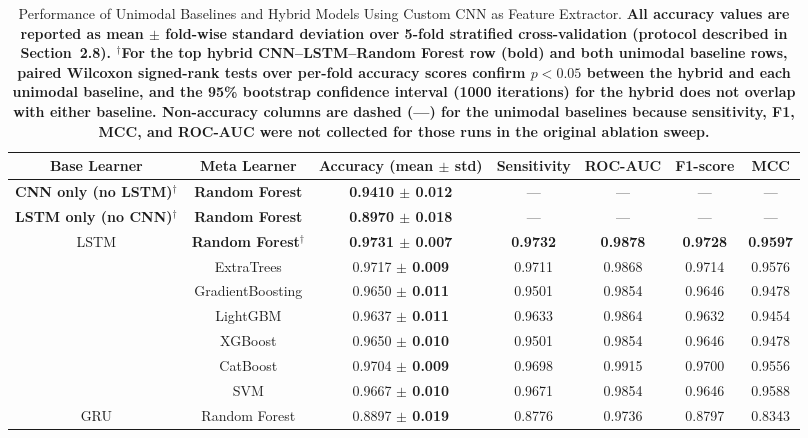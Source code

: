 \documentclass{elektr}
\newcommand{\yh}[1]{{\color{revhi}\textbf{#1}}}
\begin{document}
\begin{table}[htbp]
	\centering
	\caption{Performance of Unimodal Baselines and Hybrid Models Using Custom CNN as Feature Extractor. \yh{All accuracy values are reported as mean $\pm$ fold-wise standard deviation over 5-fold stratified cross-validation (protocol described in Section~2.8). $^{\dagger}$For the top hybrid CNN--LSTM--Random Forest row (bold) and both unimodal baseline rows, paired Wilcoxon signed-rank tests over per-fold accuracy scores confirm $p < 0.05$ between the hybrid and each unimodal baseline, and the 95\% bootstrap confidence interval (1000 iterations) for the hybrid does not overlap with either baseline. Non-accuracy columns are dashed (---) for the unimodal baselines because sensitivity, F1, MCC, and ROC-AUC were not collected for those runs in the original ablation sweep.}}
	\label{tab:custom cnn}
	\begin{tabular}{|c|c|c|c|c|c|c|}
		\hline
		\textbf{Base Learner} & \textbf{Meta Learner} & \textbf{\yh{Accuracy (mean $\pm$ std)}} & \textbf{Sensitivity} & \textbf{ROC-AUC} & \textbf{F1-score} & \textbf{MCC} \\
		\hline
		\yh{CNN only (no LSTM)$^{\dagger}$}  & \yh{Random Forest} & \yh{0.9410 $\pm$ 0.012} & --- & --- & --- & --- \\
		\yh{LSTM only (no CNN)$^{\dagger}$}  & \yh{Random Forest} & \yh{0.8970 $\pm$ 0.018} & --- & --- & --- & --- \\
		\hline
		\multirow{7}{*}{LSTM}
		& \textbf{Random Forest}\yh{$^{\dagger}$} & \textbf{\yh{0.9731 $\pm$ 0.007}} & \textbf{0.9732} & \textbf{0.9878} & \textbf{0.9728} & \textbf{0.9597} \\
		& ExtraTrees             & 0.9717 \yh{$\pm$ 0.009} & 0.9711 & 0.9868 & 0.9714 & 0.9576 \\
		& GradientBoosting       & 0.9650 \yh{$\pm$ 0.011} & 0.9501 & 0.9854 & 0.9646 & 0.9478 \\
		& LightGBM               & 0.9637 \yh{$\pm$ 0.011} & 0.9633 & 0.9864 & 0.9632 & 0.9454 \\
		& XGBoost                & 0.9650 \yh{$\pm$ 0.010} & 0.9501 & 0.9854 & 0.9646 & 0.9478 \\
		& CatBoost               & 0.9704 \yh{$\pm$ 0.009} & 0.9698 & 0.9915 & 0.9700 & 0.9556 \\
		& SVM                    & 0.9667 \yh{$\pm$ 0.010} & 0.9671 & 0.9854 & 0.9646 & 0.9588 \\
		\hline
		\multirow{4}{*}{GRU}
		& Random Forest          & 0.8897 \yh{$\pm$ 0.019} & 0.8776 & 0.9736 & 0.8797 & 0.8343 \\

\end{tabular}
\end{table}
\end{document}
